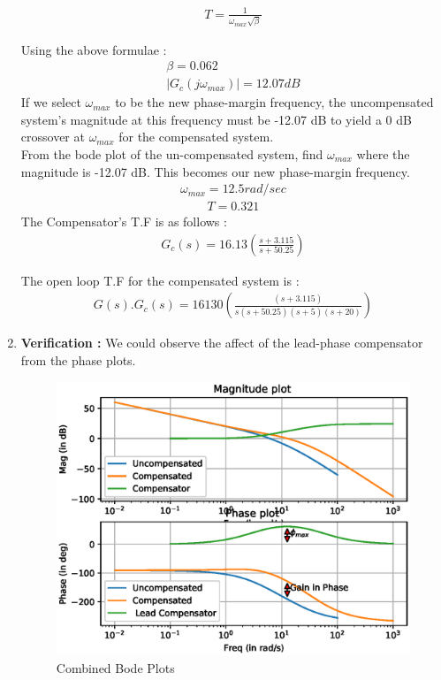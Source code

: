 \begin{enumerate}[label=\thesection.\arabic*.,ref=\thesection.\theenumi]
\begin{align}
    T = \frac{1}{\omega_{max}\sqrt{\beta}}
\end{align}

Using the above formulae :
\begin{align}
    \beta = 0.062\\
    |G_{c}(j\omega_{max})| = 12.07 dB
\end{align}
If we select $\omega_{max}$ to be the new phase-margin frequency, the uncompensated system’s magnitude at this frequency must be -12.07 dB to yield a  0 dB crossover at $\omega_{max}$ for the compensated system.\\
From the bode plot of the un-compensated system, find $\omega_{max}$ where the magnitude is -12.07 dB. This becomes our new phase-margin frequency.
\begin{align}
\omega_{max} = 12.5 rad/sec
\end{align}
\begin{align}
T = 0.321
\end{align}
The Compensator's T.F is as follows :
\begin{align}
G_{c}(s) = 16.13\left(\frac{s + 3.115}{s + 50.25}\right)
\end{align}

The open loop T.F for the compensated system is  :
\begin{align}
    G(s).G_{c}(s) = 16130\left(\frac{(s+3.115)}{s(s+50.25)(s+5)(s+20)}\right)
\end{align}
\item
\textbf{Verification : }
We could observe the  affect of the lead-phase compensator from the phase plots.\\
\begin{figure}[!h]
    \centering
    \includegraphics[width=\columnwidth]{./figs/ee18btech11026/ee18btech11026_2.eps}
    \caption{Combined Bode Plots}
    \label{fig:ee18btech11026_2}
\end{figure}



\end{enumerate}
